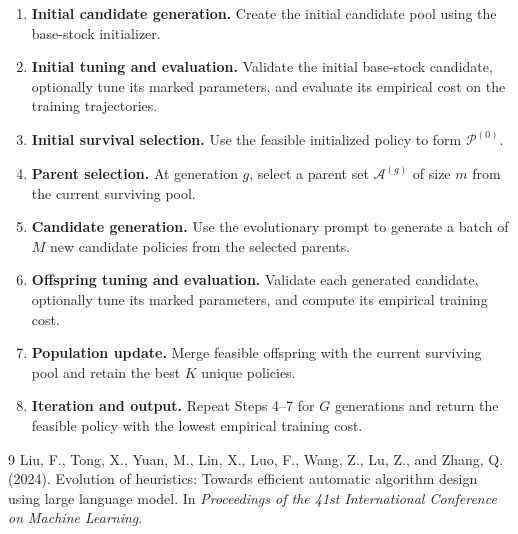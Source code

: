 \documentclass[11pt]{article}
\begin{document}
\begin{enumerate}
    \item \textbf{Initial candidate generation.} Create the initial candidate pool using the base-stock initializer.
    \item \textbf{Initial tuning and evaluation.} Validate the initial base-stock candidate, optionally tune its marked parameters, and evaluate its empirical cost on the training trajectories.
    \item \textbf{Initial survival selection.} Use the feasible initialized policy to form $\mathcal P^{(0)}$.
    \item \textbf{Parent selection.} At generation $g$, select a parent set $\mathcal A^{(g)}$ of size $m$ from the current surviving pool.
    \item \textbf{Candidate generation.} Use the evolutionary prompt to generate a batch of $M$ new candidate policies from the selected parents.
    \item \textbf{Offspring tuning and evaluation.} Validate each generated candidate, optionally tune its marked parameters, and compute its empirical training cost.
    \item \textbf{Population update.} Merge feasible offspring with the current surviving pool and retain the best $K$ unique policies.
    \item \textbf{Iteration and output.} Repeat Steps 4--7 for $G$ generations and return the feasible policy with the lowest empirical training cost.
\end{enumerate}

\begin{thebibliography}{9}
Liu, F., Tong, X., Yuan, M., Lin, X., Luo, F., Wang, Z., Lu, Z., and Zhang, Q. (2024).
\newblock Evolution of heuristics: Towards efficient automatic algorithm design using large language model.
\newblock In \emph{Proceedings of the 41st International Conference on Machine Learning}.
\end{thebibliography}
\end{document}
